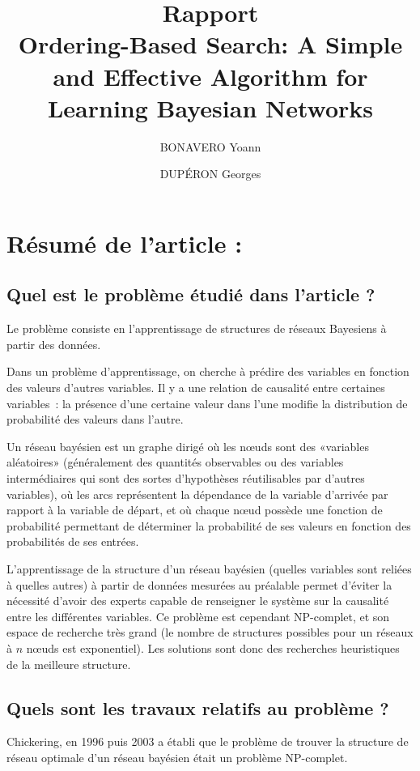 \documentclass[french,a4paper]{article}
\title{Rapport\\Ordering-Based Search: A Simple and Effective Algorithm for Learning Bayesian Networks}
\author{BONAVERO Yoann \and DUPÉRON Georges}
\begin{document}
\maketitle


\section{Résumé de l’article :}
\subsection{Quel est le problème étudié dans l’article ?}

Le problème consiste en l'apprentissage de structures de réseaux
Bayesiens à partir des données.

Dans un problème d'apprentissage, on cherche à prédire des variables
en fonction des valeurs d'autres variables. Il y a une relation de
causalité entre certaines variables~: la présence d'une certaine
valeur dans l'une modifie la distribution de probabilité des valeurs
dans l'autre.

Un réseau bayésien est un graphe dirigé où les nœuds sont des
«variables aléatoires» (généralement des quantités observables ou des
variables intermédiaires qui sont des sortes d'hypothèses
réutilisables par d'autres variables), où les arcs représentent la
dépendance de la variable d'arrivée par rapport à la variable de
départ, et où chaque nœud possède une fonction de probabilité
permettant de déterminer la probabilité de ses valeurs en fonction des
probabilités de ses entrées.

L'apprentissage de la structure d'un réseau bayésien (quelles
variables sont reliées à quelles autres) à partir de données mesurées
au préalable permet d'éviter la nécessité d'avoir des experts capable
de renseigner le système sur la causalité entre les différentes
variables. Ce problème est cependant NP-complet, et son espace de
recherche très grand (le nombre de structures possibles pour un
réseaux à $n$ nœuds est exponentiel). Les solutions sont donc des
recherches heuristiques de la meilleure structure.

\subsection{Quels sont les travaux relatifs au problème ? }
Chickering, en 1996 puis 2003 a établi que le problème de trouver la
structure de réseau optimale d'un réseau bayésien était un problème
NP-complet.
\end{document}

